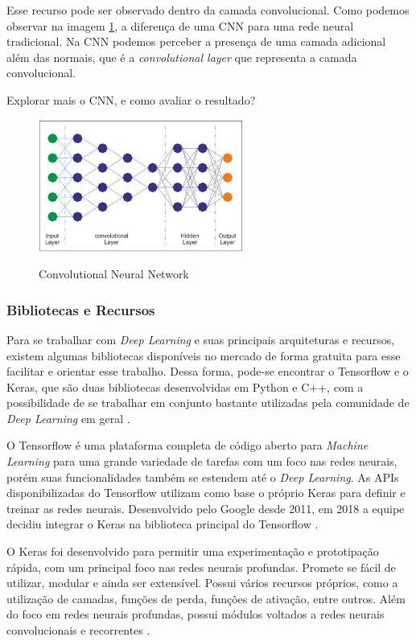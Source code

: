 Esse recurso pode ser observado dentro da camada convolucional. Como podemos observar na imagem \ref{fig:cnn}, a diferença de uma CNN para uma rede neural tradicional. Na CNN podemos perceber a presença de uma camada adicional além das normais, que é a \emph{convolutional layer} que representa a camada convolucional.

Explorar mais o CNN, e como avaliar o resultado?

\begin{figure}[!htb]
	\centering
	\caption{Convolutional Neural Network}
	\includegraphics[width=0.60\textwidth]{img/cnn.jpg}
	\label{fig:cnn}
\end{figure}

\subsubsection{Bibliotecas e Recursos}
Para se trabalhar com \emph{Deep Learning} e suas principais arquiteturas e recursos, existem algumas bibliotecas disponíveis no mercado de forma gratuita para esse facilitar e orientar esse trabalho. Dessa forma, pode-se encontrar o Tensorflow e o Keras, que são duas bibliotecas desenvolvidas em Python e C++, com a possibilidade de se trabalhar em conjunto bastante utilizadas pela comunidade de \emph{Deep Learning} em geral \cite{deepLearningTensorFlow}.

O Tensorflow é uma plataforma completa de código aberto para \emph{Machine Learning} para uma grande variedade de tarefas com um foco nas redes neurais, porém suas funcionalidades também se estendem até o \emph{Deep Learning}. As APIs disponibilizadas do Tensorflow utilizam como base o próprio Keras para definir e treinar as redes neurais. Desenvolvido pelo Google desde 2011, em 2018 a equipe decidiu integrar o Keras na biblioteca principal do Tensorflow \cite{websiteTensorFlow}.

O Keras foi desenvolvido para permitir uma experimentação e prototipação rápida, com um principal foco nas redes neurais profundas. Promete se fácil de utilizar, modular e ainda ser extensível. Possui vários recursos próprios, como a utilização de camadas, funções de perda, funções de ativação, entre outros. Além do foco em redes neurais profundas, possui módulos voltados a redes neurais convolucionais e recorrentes \cite{websiteKeras}.


